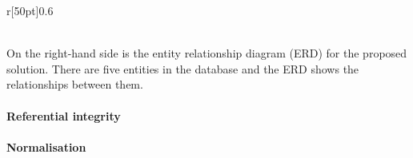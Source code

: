 \documentclass[../../main.tex]{subfiles}
\begin{document}
\begin{dummyenv}
\begin{wrapfigure}{r}[50pt]{0.6\textwidth}
\begin{framed}


        \end{framed}
        \label{fig:wrapfig}
    \end{wrapfigure}

    \noindent \\ On the right-hand side is the entity relationship
    diagram (ERD) for the proposed solution. There are five entities
    in the database and the ERD shows the relationships between them.

    \paragraph{Referential integrity}

    \paragraph{Normalisation}



\end{dummyenv}
\end{document}
